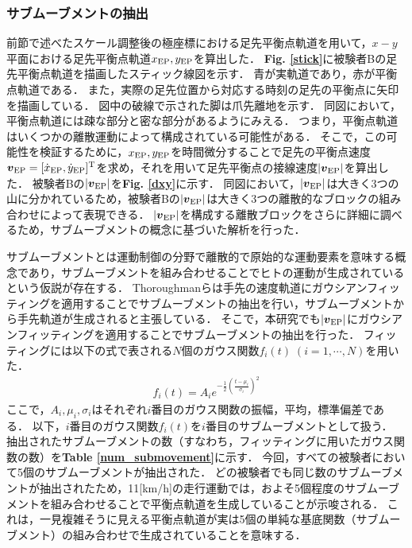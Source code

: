 \subsubsection{サブムーブメントの抽出}
前節で述べたスケール調整後の極座標における足先平衡点軌道を用いて，$x-y$平面における足先平衡点軌道$x_{\rm EP},y_{\rm EP}$を算出した．
{\bf Fig. \ref{stick}}に被験者Bの足先平衡点軌道を描画したスティック線図を示す．
青が実軌道であり，赤が平衡点軌道である．
また，実際の足先位置から対応する時刻の足先の平衡点に矢印を描画している．
図中の破線で示された脚は爪先離地を示す．
同図において，平衡点軌道には疎な部分と密な部分があるようにみえる．
つまり，平衡点軌道はいくつかの離散運動によって構成されている可能性がある．
そこで，この可能性を検証するために，$x_{\rm EP},y_{\rm EP}$を時間微分することで足先の平衡点速度$\mbox{\boldmath $v$}_{\rm EP}=[\dot{x}_{\rm EP},\dot{y}_{\rm EP}]^{\rm T}$を求め，それを用いて足先平衡点の接線速度$|\mbox{\boldmath $v$}_{\rm EP}|$を算出した．
被験者Bの$|\mbox{\boldmath $v$}_{\rm EP}|$を{\bf Fig. \ref{dxy}}に示す．
同図において，$|\mbox{\boldmath $v$}_{\rm EP}|$は大きく3つの山に分かれているため，被験者Bの$|\mbox{\boldmath $v$}_{\rm EP}|$は大きく3つの離散的なブロックの組み合わせによって表現できる．
$|\mbox{\boldmath $v$}_{\rm EP}|$を構成する離散ブロックをさらに詳細に調べるため，サブムーブメントの概念に基づいた解析を行った．

サブムーブメントとは運動制御の分野で離散的で原始的な運動要素を意味する概念であり，サブムーブメントを組み合わせることでヒトの運動が生成されているという仮説が存在する\cite{Woodworth1899}．
Thoroughmanらは手先の速度軌道にガウシアンフィッティングを適用することでサブムーブメントの抽出を行い，サブムーブメントから手先軌道が生成されると主張している\cite{Thoroughman2000}．
そこで，本研究でも$|\mbox{\boldmath $v$}_{\rm EP}|$にガウシアンフィッティングを適用することでサブムーブメントの抽出を行った．
フィッティングには以下の式で表される$N$個のガウス関数$f_i(t)\;(i=1,\cdots,N)$を用いた．
\begin{eqnarray}
 \label{def_gaussian}
 f_i(t)=A_ie^{-\frac{1}{2}\left(\frac{t-\mu_i}{\sigma_i}\right)^2}
\end{eqnarray}
ここで，$A_i,\mu_i,\sigma_i$はそれぞれ$i$番目のガウス関数の振幅，平均，標準偏差である．
以下，$i$番目のガウス関数$f_i(t)$を$i$番目のサブムーブメントとして扱う．
抽出されたサブムーブメントの数（すなわち，フィッティングに用いたガウス関数の数）を{\bf Table \ref{num_submovement}}に示す．
今回，すべての被験者において5個のサブムーブメントが抽出された．
どの被験者でも同じ数のサブムーブメントが抽出されたため，11[km/h]の走行運動では，およそ5個程度のサブムーブメントを組み合わせることで平衡点軌道を生成していることが示唆される．
これは，一見複雑そうに見える平衡点軌道が実は5個の単純な基底関数（サブムーブメント）の組み合わせで生成されていることを意味する．

